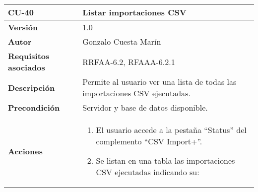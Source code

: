 \begin{longtable}[]{@{}ll@{}}
\toprule
\begin{minipage}[b]{0.19\columnwidth}\raggedright
\textbf{CU-40}\strut
\end{minipage} & \begin{minipage}[b]{0.75\columnwidth}\raggedright
\textbf{Listar importaciones CSV}\strut
\end{minipage}\tabularnewline
\midrule
\endhead
\begin{minipage}[t]{0.19\columnwidth}\raggedright
\textbf{Versión}\strut
\end{minipage} & \begin{minipage}[t]{0.75\columnwidth}\raggedright
1.0\strut
\end{minipage}\tabularnewline
\begin{minipage}[t]{0.19\columnwidth}\raggedright
\textbf{Autor}\strut
\end{minipage} & \begin{minipage}[t]{0.75\columnwidth}\raggedright
Gonzalo Cuesta Marín\strut
\end{minipage}\tabularnewline
\begin{minipage}[t]{0.19\columnwidth}\raggedright
\textbf{Requisitos asociados}\strut
\end{minipage} & \begin{minipage}[t]{0.75\columnwidth}\raggedright
RRFAA-6.2, RFAAA-6.2.1\strut
\end{minipage}\tabularnewline
\begin{minipage}[t]{0.19\columnwidth}\raggedright
\textbf{Descripción}\strut
\end{minipage} & \begin{minipage}[t]{0.75\columnwidth}\raggedright
Permite al usuario ver una lista de todas las importaciones CSV
ejecutadas.\strut
\end{minipage}\tabularnewline
\begin{minipage}[t]{0.19\columnwidth}\raggedright
\textbf{Precondición}\strut
\end{minipage} & \begin{minipage}[t]{0.75\columnwidth}\raggedright
Servidor y base de datos disponible.\strut
\end{minipage}\tabularnewline
\begin{minipage}[t]{0.19\columnwidth}\raggedright
\textbf{Acciones}\strut
\end{minipage} & \begin{minipage}[t]{0.75\columnwidth}\raggedright
\begin{enumerate}
\def\labelenumi{\arabic{enumi}.}
\tightlist
\item
  El usuario accede a la pestaña ``Status'' del complemento ``CSV Import+''.
\item
  Se listan en una tabla las importaciones CSV ejecutadas indicando su:


\end{enumerate}
\end{minipage}
\end{longtable}
